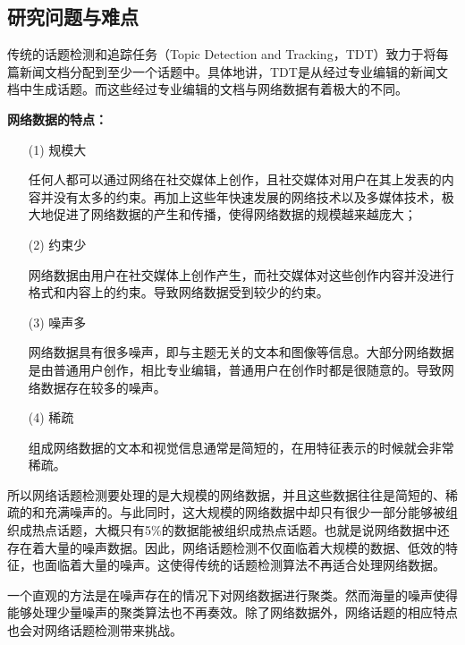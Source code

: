 \subsection{研究问题与难点}

传统的话题检测和追踪任务（Topic Detection and Tracking，TDT）\citep{allan-1998-TDT}致力于将每篇新闻文档分配到至少一个话题中。具体地讲，TDT是从经过专业编辑的新闻文档中生成话题\citep{Allan2002Topic}。而这些经过专业编辑的文档与网络数据有着极大的不同。

\textbf{网络数据的特点：}
\begin{enumerate}
    \item[(1)] 规模大

    任何人都可以通过网络在社交媒体上创作，且社交媒体对用户在其上发表的内容并没有太多的约束。再加上这些年快速发展的网络技术以及多媒体技术，极大地促进了网络数据的产生和传播，使得网络数据的规模越来越庞大；

    \item[(2)] 约束少

    网络数据由用户在社交媒体上创作产生，而社交媒体对这些创作内容并没进行格式和内容上的约束。导致网络数据受到较少的约束。

    \item[(3)] 噪声多

    网络数据具有很多噪声，即与主题无关的文本和图像等信息。大部分网络数据是由普通用户创作，相比专业编辑，普通用户在创作时都是很随意的。导致网络数据存在较多的噪声。

    \item[(4)] 稀疏

    组成网络数据的文本和视觉信息通常是简短的，在用特征表示的时候就会非常稀疏。
\end{enumerate}

所以网络话题检测要处理的是大规模的网络数据，并且这些数据往往是简短的、稀疏的和充满噪声的\citep{wxzhao2011comparing}。与此同时，这大规模的网络数据中却只有很少一部分能够被组织成热点话题，大概只有5\%的数据能被组织成热点话题\citep{pang-2013-unsupervised}。也就是说网络数据中还存在着大量的噪声数据。因此，网络话题检测不仅面临着大规模的数据、低效的特征，也面临着大量的噪声。这使得传统的话题检测算法\citep{yang1998astudy,Allan2002Topic,zhai2005tracking,ponsporrata2007topics}不再适合处理网络数据。

一个直观的方法是在噪声存在的情况下对网络数据进行聚类。然而海量的噪声使得能够处理少量噪声的聚类算法\citep{bojchevski2017RSC,maurus2016skinny,blei-2003-LDA}也不再奏效。除了网络数据外，网络话题的相应特点也会对网络话题检测带来挑战。

